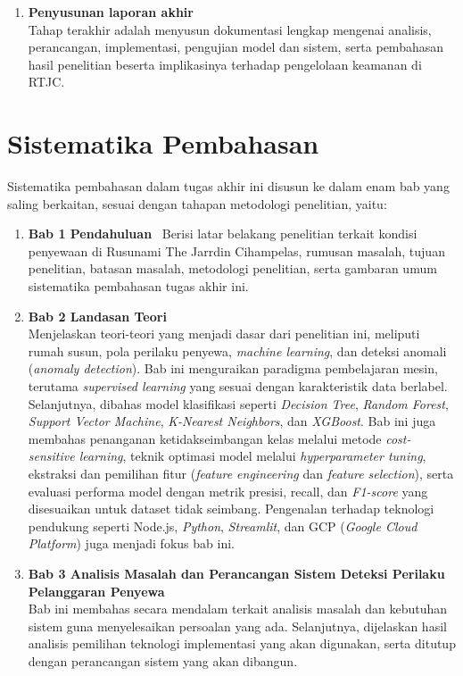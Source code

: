 \begin{enumerate}
    \item \textbf{Penyusunan laporan akhir} \\
    Tahap terakhir adalah menyusun dokumentasi lengkap mengenai analisis, perancangan, implementasi, pengujian model dan sistem, serta pembahasan hasil penelitian beserta implikasinya terhadap pengelolaan keamanan di RTJC.
\end{enumerate}


\section{Sistematika Pembahasan}
\label{sec:sispem}
Sistematika pembahasan dalam tugas akhir ini disusun ke dalam enam bab yang saling berkaitan, sesuai dengan tahapan metodologi penelitian, yaitu:

\begin{enumerate}

    \item \textbf{Bab 1 Pendahuluan} \
    Berisi latar belakang penelitian terkait kondisi penyewaan di Rusunami The Jarrdin Cihampelas, rumusan masalah, tujuan penelitian, batasan masalah, metodologi penelitian, serta gambaran umum sistematika pembahasan tugas akhir ini.

    \item \textbf{Bab 2 Landasan Teori} \\
    Menjelaskan teori-teori yang menjadi dasar dari penelitian ini, meliputi rumah susun, pola perilaku penyewa, \textit{machine learning}, dan deteksi anomali (\textit{anomaly detection}). Bab ini menguraikan paradigma pembelajaran mesin, terutama \textit{supervised learning} yang sesuai dengan karakteristik data berlabel. Selanjutnya, dibahas model klasifikasi seperti \textit{Decision Tree}, \textit{Random Forest}, \textit{Support Vector Machine}, \textit{K-Nearest Neighbors}, dan \textit{XGBoost}. Bab ini juga membahas penanganan ketidakseimbangan kelas melalui metode \textit{cost-sensitive learning}, teknik optimasi model melalui \textit{hyperparameter tuning}, ekstraksi dan pemilihan fitur (\textit{feature engineering} dan \textit{feature selection}), serta evaluasi performa model dengan metrik presisi, recall, dan \textit{F1-score} yang disesuaikan untuk dataset tidak seimbang. Pengenalan terhadap teknologi pendukung seperti Node.js, \textit{Python}, \textit{Streamlit}, dan GCP (\textit{Google Cloud Platform}) juga menjadi fokus bab ini.

    \item \textbf{Bab 3 Analisis Masalah dan Perancangan Sistem Deteksi Perilaku Pelanggaran Penyewa} \\
    Bab ini membahas secara mendalam terkait analisis masalah dan kebutuhan sistem guna menyelesaikan persoalan yang ada. Selanjutnya, dijelaskan hasil analisis pemilihan teknologi implementasi yang akan digunakan, serta ditutup dengan perancangan sistem yang akan dibangun.
    

\end{enumerate}

